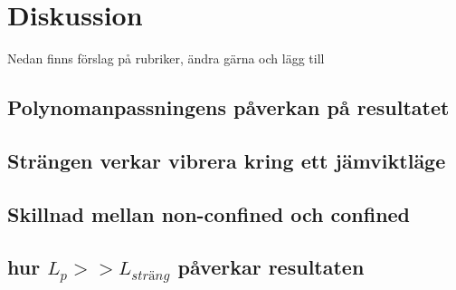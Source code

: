 



\section{Diskussion}

Nedan finns förslag på rubriker, ändra gärna och lägg till

\subsection{Polynomanpassningens påverkan på resultatet}

\subsection{Strängen verkar vibrera kring ett jämviktläge}

\subsection{Skillnad mellan non-confined och confined}

\subsection{hur $L_{p}>>L_{sträng}$ påverkar resultaten}


